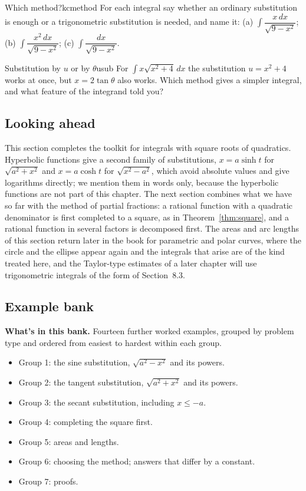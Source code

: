 \documentclass[11pt]{article}
\begin{document}
\begin{kc}{Which method?}{kcmethod}
For each integral say whether an ordinary substitution is enough or a trigonometric substitution is needed, and name it: \textup{(a)} $\int\dfrac{x\,dx}{\sqrt{9-x^2}}$; \textup{(b)} $\int\dfrac{x^2\,dx}{\sqrt{9-x^2}}$; \textup{(c)} $\int\dfrac{dx}{\sqrt{9-x^2}}$.
\end{kc}

\begin{think}{Substitution by $u$ or by $\theta$}{usub}
For $\int x\sqrt{x^2+4}\,dx$ the substitution $u=x^2+4$ works at once, but $x=2\tan\theta$ also works. Which method gives a simpler integral, and what feature of the integrand told you?
\end{think}

\subsection*{Looking ahead}

This section completes the toolkit for integrals with square roots of quadratics. Hyperbolic functions give a second family of substitutions, $x=a\sinh t$ for $\sqrt{a^2+x^2}$ and $x=a\cosh t$ for $\sqrt{x^2-a^2}$, which avoid absolute values and give logarithms directly; we mention them in words only, because the hyperbolic functions are not part of this chapter. The next section combines what we have so far with the method of partial fractions: a rational function with a quadratic denominator is first completed to a square, as in Theorem~\ref{thm:square}, and a rational function in several factors is decomposed first. The areas and arc lengths of this section return later in the book for parametric and polar curves, where the circle and the ellipse appear again and the integrals that arise are of the kind treated here, and the Taylor-type estimates of a later chapter will use trigonometric integrals of the form of Section~8.3.

\subsection*{Example bank}

\textbf{What's in this bank.} Fourteen further worked examples, grouped by problem type and ordered from easiest to hardest within each group.
\begin{itemize}[nosep]
  \item Group 1: the sine substitution, $\sqrt{a^2-x^2}$ and its powers.
  \item Group 2: the tangent substitution, $\sqrt{a^2+x^2}$ and its powers.
  \item Group 3: the secant substitution, including $x\le-a$.
  \item Group 4: completing the square first.
  \item Group 5: areas and lengths.
  \item Group 6: choosing the method; answers that differ by a constant.
  \item Group 7: proofs.
\end{itemize}
\end{document}
